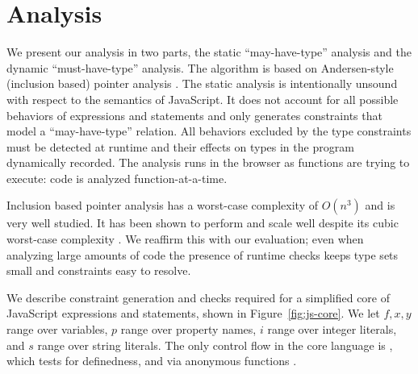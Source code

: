 \section{Analysis}
\label{sec:analysis}

We present our analysis in two parts, the static ``may-have-type'' analysis
and the dynamic ``must-have-type'' analysis. The algorithm is based on
Andersen-style (inclusion based) pointer analysis \cite{AndersenPhD}. The
static analysis is
intentionally unsound with respect to the semantics of
JavaScript. It does not account for all possible behaviors of expressions and
statements and only generates constraints that model a ``may-have-type''
relation. All behaviors excluded by the type constraints must be detected at
runtime and their effects on types in the program dynamically recorded. The
analysis runs in the browser as functions are trying to execute: code is
analyzed function-at-a-time.

Inclusion based pointer analysis has a worst-case complexity of $O(n^3)$
and is very
well studied. It has been shown to
perform and scale well despite its cubic worst-case complexity
\cite{Sridharan09}.
We reaffirm this with our evaluation;
even when analyzing large amounts of code the presence of runtime checks keeps type sets
small and constraints easy to resolve.

%
%
%
%
%
%

We describe constraint generation and checks required for a simplified core of
JavaScript expressions and statements, shown in Figure~\ref{fig:js-core}. We
let $f,x,y$ range over variables, $p$ range over property names, $i$ range over
integer literals, and $s$ range over string literals. The only control flow in
the core language is , which tests for definedness, and via anonymous
functions .

